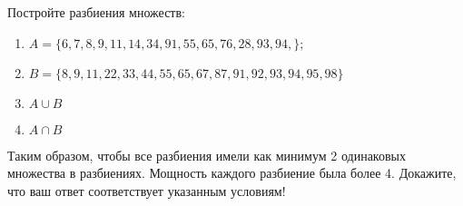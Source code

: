 \question
Постройте разбиения множеств:
\begin{enumerate}
	\renewcommand{\labelenumi}{\alph{enumi})}
	\item $A = \{6, 7, 8, 9, 11, 14, 34, 91, 55, 65, 76, 28, 93, 94, \};$
	\item $B = \{8, 9, 11, 22, 33, 44, 55, 65, 67, 87, 91, 92, 93, 94, 95, 98\}$
	\item $A \cup B$
	\item $A \cap B$
\end{enumerate}
Таким образом, чтобы все разбиения имели как минимум 2 одинаковых множества в разбиениях.
Мощность каждого разбиение была более 4.
Докажите, что ваш ответ соответствует указанным условиям!